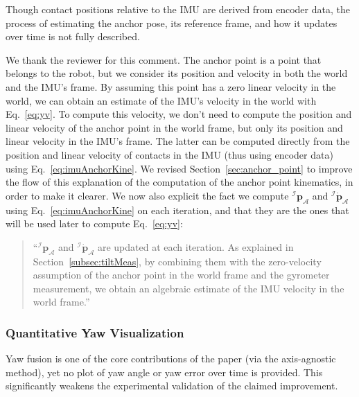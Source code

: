 \begin{revquote}
Though contact positions relative to the IMU are derived from encoder data, the process of estimating the anchor pose, its reference frame, and how it updates over time is not fully described.
\end{revquote}

We thank the reviewer for this comment. The anchor point is a point that belongs to the robot, but we consider its position and velocity in both the world and the IMU's frame. By assuming this point has a zero linear velocity in the world, we can obtain an estimate of the IMU's velocity in the world with Eq.~\eqref{eq:yv}. To compute this velocity, we don't need to compute the position and linear velocity of the anchor point in the world frame, but only its position and linear velocity in the IMU's frame. The latter can be computed directly from the position and linear velocity of contacts in the IMU (thus using encoder data) using Eq.~\eqref{eq:imuAnchorKine}. 
We revised Section~\ref{sec:anchor_point} to improve the flow of this explanation of the computation of the anchor point kinematics, in order to make it clearer. We now also explicit the fact we compute ${^{\mathcal{I}}}\boldsymbol{p}_{\mathcal{A}}$ and ${^{\mathcal{I}}} \dot{\boldsymbol{p}}_{\mathcal{A}}$ using Eq.~\eqref{eq:imuAnchorKine} on each iteration, and that they are the ones that will be used later to compute Eq.~\eqref{eq:yv}:
\begin{quote}
  ``${^{\mathcal{I}}}\boldsymbol{p}_{\mathcal{A}}$ and ${^{\mathcal{I}}} \dot{\boldsymbol{p}}_{\mathcal{A}}$ are updated at each iteration. As explained in Section~\ref{subsec:tiltMeas}, by combining them with the zero-velocity assumption of the anchor point in the world frame and the gyrometer measurement, we obtain an algebraic estimate of the IMU velocity in the world frame.''
\end{quote}

 

\subsubsection{Quantitative Yaw Visualization}

\begin{revquote}
Yaw fusion is one of the core contributions of the paper (via the axis-agnostic method), yet no plot of yaw angle or yaw error over time is provided. This significantly weakens the experimental validation of the claimed improvement.
\end{revquote}


